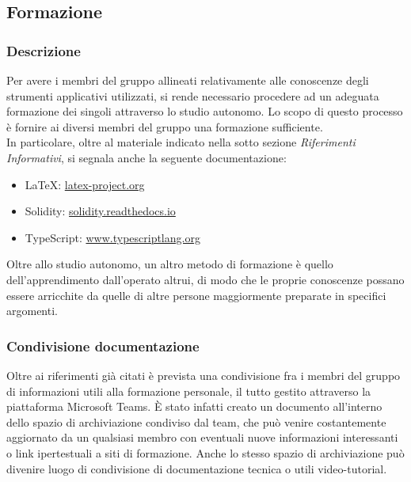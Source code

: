 \subsection{Formazione}
		\subsubsection{Descrizione}	
		Per avere i membri del gruppo \Gruppo{} allineati relativamente alle conoscenze degli strumenti applicativi utilizzati, si rende necessario procedere ad un adeguata formazione dei singoli attraverso lo studio autonomo. Lo scopo di questo processo è fornire ai diversi membri del gruppo una formazione sufficiente.\\
		In particolare, oltre al materiale indicato nella sotto sezione \textit{Riferimenti Informativi}, si segnala anche la seguente documentazione:
		\begin{itemize}
			\item \LaTeX{}: \href{latex-project.org}{latex-project.org}
			\item Solidity: \href{solidity.readthedocs.io}{solidity.readthedocs.io}
			\item TypeScript: \href{www.typescriptlang.org}{www.typescriptlang.org}
		\end{itemize}
		Oltre allo studio autonomo, un altro metodo di formazione è quello dell'apprendimento dall'operato altrui, di modo che le proprie conoscenze possano essere arricchite da quelle di altre persone maggiormente preparate in specifici argomenti.
		
		\subsubsection{Condivisione documentazione}
		Oltre ai riferimenti già citati è prevista una condivisione fra i membri del gruppo di informazioni utili alla formazione personale, il tutto gestito attraverso la piattaforma Microsoft Teams. È stato infatti creato un documento all'interno dello spazio di archiviazione condiviso dal team, che può venire costantemente aggiornato da un qualsiasi membro con eventuali nuove informazioni interessanti o link ipertestuali a siti di formazione. Anche lo stesso spazio di archiviazione può divenire luogo di condivisione di documentazione tecnica o utili video-tutorial.
